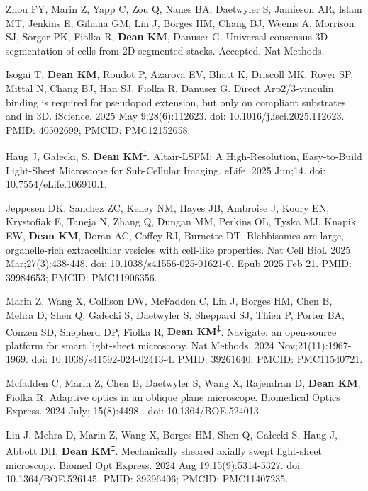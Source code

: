 \begin{etaremune}

\item Zhou FY, Marin Z, Yapp C, Zou Q, Nanes BA, Daetwyler S, Jamieson AR, Islam MT, Jenkins E, Gihana GM, Lin J, Borges HM, Chang BJ, Weems A, Morrison SJ, Sorger PK, Fiolka R, \textbf{Dean KM}, Danuser G. Universal consensus 3D segmentation of cells from 2D segmented stacks. Accepted, Nat Methods.

\item Isogai T, \textbf{Dean KM}, Roudot P, Azarova EV, Bhatt K, Driscoll MK, Royer SP, Mittal N, Chang BJ, Han SJ, Fiolka R, Danuser G. Direct Arp2/3-vinculin binding is required for pseudopod extension, but only on compliant substrates and in 3D. iScience. 2025 May 9;28(6):112623. doi: 10.1016/j.isci.2025.112623. PMID: 40502699; PMCID: PMC12152658.

\item Haug J, Gałecki, S, \textbf{Dean KM\textsuperscript{‡}}. Altair-LSFM: A High-Resolution, Easy-to-Build Light-Sheet Microscope for Sub-Cellular Imaging. eLife. 2025 Jun;14. doi: 10.7554/eLife.106910.1.


\item Jeppesen DK, Sanchez ZC, Kelley NM, Hayes JB, Ambroise J, Koory EN, Krystofiak E, Taneja N, Zhang Q, Dungan MM, Perkins OL, Tyska MJ, Knapik EW, \textbf{Dean KM}, Doran AC, Coffey RJ, Burnette DT. Blebbisomes are large, organelle-rich extracellular vesicles with cell-like properties. Nat Cell Biol. 2025 Mar;27(3):438-448. doi: 10.1038/s41556-025-01621-0. Epub 2025 Feb 21. PMID: 39984653; PMCID: PMC11906356.

\item Marin Z, Wang X, Collison DW, McFadden C, Lin J, Borges HM, Chen B, Mehra D, Shen Q, Gałecki S, Daetwyler S, Sheppard SJ, Thien P, Porter BA, Conzen SD, Shepherd DP, Fiolka R, \textbf{Dean KM\textsuperscript{‡}}. Navigate: an open-source platform for smart light-sheet microscopy. Nat Methods. 2024 Nov;21(11):1967-1969. doi: 10.1038/s41592-024-02413-4. PMID: 39261640; PMCID: PMC11540721.

\item Mcfadden C, Marin Z, Chen B, Daetwyler S, Wang X, Rajendran D, \textbf{Dean KM}, Fiolka R. Adaptive optics in an oblique plane microscope. Biomedical Optics Express. 2024 July; 15(8):4498-. doi: 10.1364/BOE.524013.

\item Lin J, Mehra D, Marin Z, Wang X, Borges HM, Shen Q, Gałecki S, Haug J, Abbott DH, \textbf{Dean KM\textsuperscript{‡}}. Mechanically sheared axially swept light-sheet microscopy. Biomed Opt Express. 2024 Aug 19;15(9):5314-5327. doi: 10.1364/BOE.526145. PMID: 39296406; PMCID: PMC11407235.


\end{etaremune}
